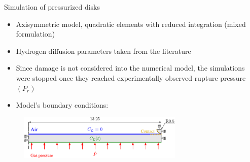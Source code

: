 \documentclass[9pt]{beamer}
\begin{document}

\begin{frame}{Simulation of pressurized disks}

\begin{itemize}
	\item Axisymmetric model, quadratic elements with reduced integration (mixed formulation)
	\vspace{0.15cm}
	\item Hydrogen diffusion parameters taken from the literature
	\vspace{0.15cm}
	\item Since damage is not considered into the numerical model, the simulations were stopped once they reached experimentally observed rupture pressure $(P_r)$
	\vspace{0.15cm} 
	\item Model's boundary conditions:
\end{itemize}

\begin{figure}
	\centering
	\includegraphics[width=0.7\textwidth]{Images/all_BC_std.pdf} \\
\end{figure}

\end{frame}

\end{document}
